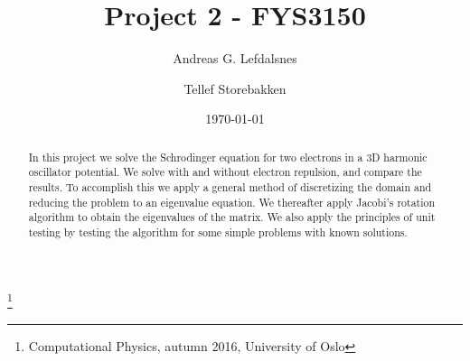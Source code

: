 \documentclass[%
 reprint,
 nobalancelastpage,
 amsmath,amssymb,
 aps,
]{revtex4-1}
\begin{document}

\title{Project 2 - FYS3150}%
\thanks{Computational Physics, autumn 2016, University of Oslo}%

\author{Andreas G. Lefdalsnes}

%

\author{Tellef Storebakken}




\date{\today}%

\begin{abstract}
In this project we solve the Schrodinger equation for two electrons in a 3D harmonic oscillator potential. We solve with and without electron repulsion, and compare the results. To accomplish this we apply a general method of discretizing the domain and reducing the problem to an eigenvalue equation. We thereafter apply Jacobi's rotation algorithm to obtain the eigenvalues of the matrix. We also apply the principles of unit testing by testing the algorithm for some simple problems with known solutions.

\end{abstract}
\end{document}
